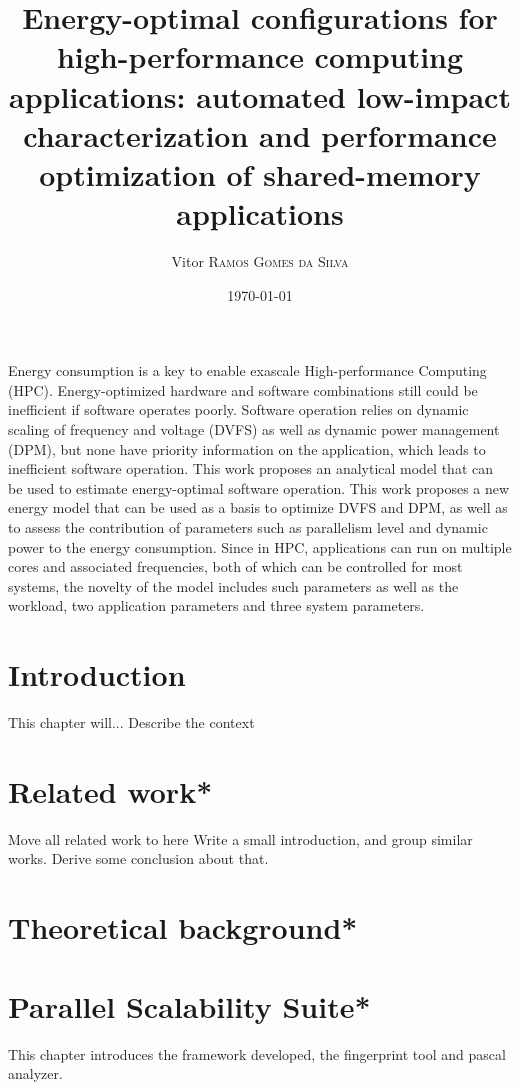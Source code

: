 \documentclass[
papersize=a4,
pagelayout=default,
fontname=latinmodern,
fontsize=11pt,
twoside,
final,
faculty=fpms,
]{umons-Thesis}
\author{Vitor \textsc{Ramos Gomes da Silva}}
\date{\today}
\title{Energy-optimal configurations for high-performance computing applications: automated low-impact characterization and performance optimization of shared-memory applications}
\begin{document}
	
	\umonsThesisTitlePage
	
	
	\frontmatter
	
	\begin{umonsThesisAbstract}
		Energy consumption is a key to enable exascale High-performance Computing (HPC). Energy-optimized hardware and software combinations still could be inefficient if software operates poorly. 
		Software operation relies on dynamic scaling of frequency and voltage (DVFS) as well as dynamic power management (DPM), but none have priority information on the application, which leads to inefficient software operation. This work proposes an analytical model that can be used to estimate energy-optimal software operation. 
		This work proposes a new energy model that can be used as a basis to optimize DVFS and DPM, as well as to assess the contribution of parameters such as parallelism level and dynamic power to the energy consumption.
		Since in HPC, applications can run on multiple cores and associated frequencies, both of which can be controlled for most systems, the novelty of the model includes such parameters as well as the workload, two application parameters and three system parameters.
	\end{umonsThesisAbstract}
	
	
	\tableofcontents*
	\listoffigures*
	\listoftables*
	
	
	\mainmatter
	
	\chapter{Introduction}
	This chapter will...
	Describe the context
	
	
	\chapter{Related work*}
	Move all related work to here
	Write a small introduction, and group similar works.
	Derive some conclusion about that.
	
	\chapter{Theoretical background*}
	
	\chapter{Parallel Scalability Suite*}
	This chapter introduces the framework developed, the fingerprint tool and pascal analyzer.
	
\end{document}
